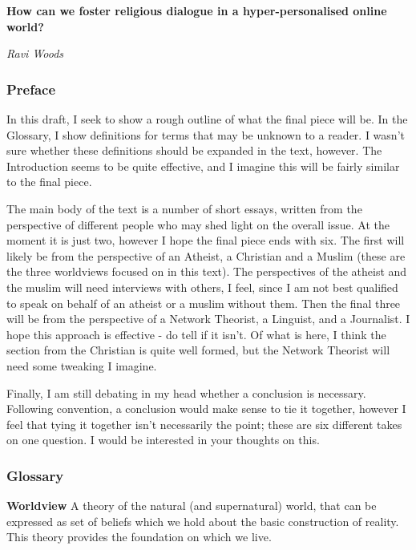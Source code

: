 \documentclass[]{article}
\date{}
\begin{document}
{\textbf{How can we foster religious dialogue in a hyper-personalised
online world?}}

{\emph{Ravi Woods}}

\hypertarget{preface}{%
\subsubsection{Preface}\label{preface}}

In this draft, I seek to show a rough outline of what the final piece
will be. In the Glossary, I show definitions for terms that may be
unknown to a reader. I wasn't sure whether these definitions should be
expanded in the text, however. The Introduction seems to be quite
effective, and I imagine this will be fairly similar to the final piece.

The main body of the text is a number of short essays, written from the
perspective of different people who may shed light on the overall issue.
At the moment it is just two, however I hope the final piece ends with
six. The first will likely be from the perspective of an Atheist, a
Christian and a Muslim (these are the three worldviews focused on in
this text). The perspectives of the atheist and the muslim will need
interviews with others, I feel, since I am not best qualified to speak
on behalf of an atheist or a muslim without them. Then the final three
will be from the perspective of a Network Theorist, a Linguist, and a
Journalist. I hope this approach is effective - do tell if it isn't. Of
what is here, I think the section from the Christian is quite well
formed, but the Network Theorist will need some tweaking I imagine.

Finally, I am still debating in my head whether a conclusion is
necessary. Following convention, a conclusion would make sense to tie it
together, however I feel that tying it together isn't necessarily the
point; these are six different takes on one question. I would be
interested in your thoughts on this.

\hypertarget{glossary}{%
\subsubsection{Glossary}\label{glossary}}

\textbf{Worldview} A theory of the natural (and supernatural) world,
that can be expressed as set of beliefs which we hold about the basic
construction of reality. This theory provides the foundation on which we
live.
\end{document}
